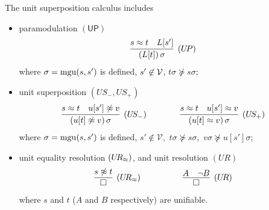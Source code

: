 

\begin{definition}\label{def:unit-superpositin-calculus}
	The {\myem unit superposition calculus} includes 
	\begin{itemize}
		\item paramodulation $\mathsf{(UP)}$
		\begin{gather*}
		\infer
		[(U\!P)]
		{(L[t])\,\sigma}
		{s\mEQ t&L[s']}
		\end{gather*}
		where $\sigma=\operatorname{mgu}(s,s')$ is defined,
		$s'\not\in{\mathcal V}$,
		$t\sigma\not\succcurlyeq s\sigma$;
		\item unit superposition $(U\!S_-,U\!S_+)$
		\begin{gather*}
		\infer
		[(U\!S_-)]
		{(u[t]\mNE v)\,\sigma}
		{s\mEQ t&u[s']\mNE v}
		\qquad\qquad
		\infer
		[(U\!S_+)]
		{(u[t]\mEQ v)\,\sigma}
		{s\mEQ t&u[s']\mEQ v}
		\end{gather*}
		where $\sigma=\operatorname{mgu}(s,s')$ is defined,
		$s'\not\in\mathcal{V},$
		$t\sigma\not\succcurlyeq s\sigma,$
		$v\sigma\not\succcurlyeq u[s']\sigma$;
		\item unit equality resolution $(U\!R_\approx)$, and unit resolution $(U\!R)$
		\begin{gather*}
		\infer
		[(U\!R_\mEQ)]
		{\emptyclause}
		{s\mNE t}
		\quad\quad\quad\qquad
		\infer
		[(U\!R)]
		{\emptyclause}
		{A&\lnot B}
		\end{gather*}
		where $s$ and $t$ ($A$ and $B$ respectively) are unifiable.
	\end{itemize}
\end{definition}